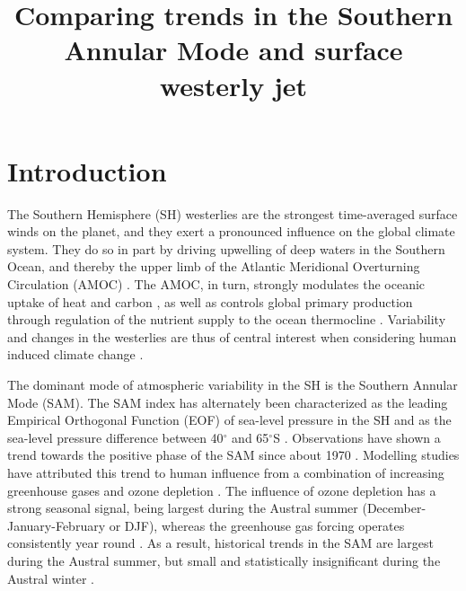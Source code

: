 \documentclass{ametsoc}
\title{Comparing trends in the Southern Annular Mode and surface westerly jet}
\affiliation{Canadian Center for Climate Modelling and Analysis, Victoria, BC, Canada}
\begin{document}
\maketitle

\section{Introduction}
The Southern Hemisphere (SH) westerlies are the strongest time-averaged surface winds on the planet,  and they 
exert a pronounced influence on the global climate system. They do so in part by driving upwelling of deep waters
in the Southern Ocean, and thereby the upper limb of the Atlantic Meridional Overturning Circulation (AMOC)
\citep{Toggweiler_Samuels_1995, Marshall_and_Speer_2012}. The AMOC, in turn, strongly modulates the oceanic 
uptake of heat and carbon \citep{Kostov_et_al_2014, Frolicher_et_al_2014}, as well as controls global 
primary production through regulation of the nutrient supply to the ocean thermocline \citep{Sarmiento_et_al_2003, 
Marinov_et_al_2006}. Variability and changes in the westerlies are thus of central interest when considering 
human induced climate change \citep{Toggweiler_and_Russell_2008}.

The dominant mode of atmospheric variability in the SH is the Southern Annular Mode (SAM). The SAM index
has alternately been characterized as the leading Empirical Orthogonal Function (EOF) of sea-level pressure in the SH
\citep{Thompson_and_Wallace_2000} and as the sea-level pressure
difference between 40$^{\circ}$ and 65$^{\circ}$S \citep{Gong_and_Wang_1999}. Observations have shown a trend
towards the positive phase of the SAM since about 1970 \citep{Thompson_and_Solomon_2002, Marshall_2003}. Modelling
studies have attributed this trend to human influence from a combination of increasing greenhouse gases
and ozone depletion \citep{Fyfe_et_al_1999, Son_et_al_2010, Gillett_et_al_2013}. The influence of ozone depletion
has a strong seasonal signal, being largest during the Austral summer (December-January-February or DJF), 
whereas the greenhouse gas forcing operates consistently year round 
\citep{Son_et_al_2010, Thompson_et_al_2011, Gillett_et_al_2013}. As a result, historical trends in the SAM
are largest during the Austral summer, but small and 
statistically insignificant during the Austral winter \citep{Thompson_et_al_2011}.
\end{document}
